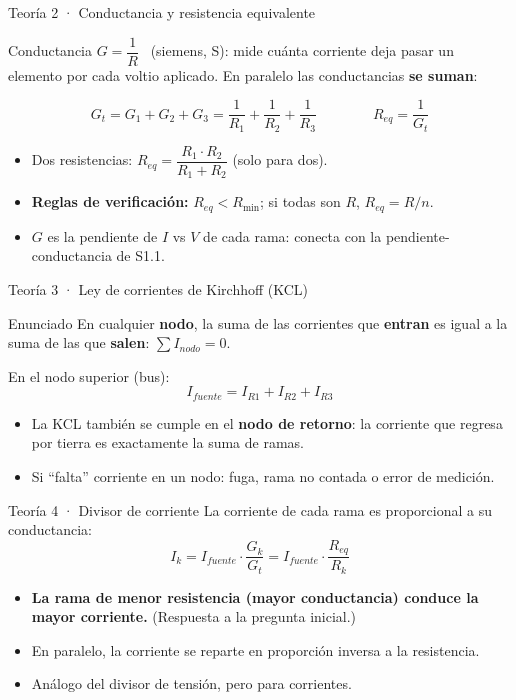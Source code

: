 \documentclass[aspectratio=169]{beamer}
\begin{document}
\begin{frame}{Teoría 2 · Conductancia y resistencia equivalente}
  \begin{block}{Conductancia}
    $G = \dfrac{1}{R}$ \ (siemens, S): mide cuánta corriente deja pasar un
    elemento por cada voltio aplicado. En paralelo las conductancias \textbf{se suman}:
  \end{block}
  \[
    G_t = G_1 + G_2 + G_3 = \frac{1}{R_1} + \frac{1}{R_2} + \frac{1}{R_3}
    \qquad\qquad
    R_{eq} = \frac{1}{G_t}
  \]
  \pause
  \begin{itemize}
    \item Dos resistencias: $R_{eq} = \dfrac{R_1\cdot R_2}{R_1 + R_2}$ (solo para dos).
    \item \textbf{Reglas de verificación:} $R_{eq} < R_{\min}$; si todas son $R$, $R_{eq} = R/n$.
    \item $G$ es la pendiente de $I$ vs $V$ de cada rama: conecta con la pendiente-conductancia de S1.1.
  \end{itemize}
\end{frame}

\begin{frame}{Teoría 3 · Ley de corrientes de Kirchhoff (KCL)}
  \begin{block}{Enunciado}
    En cualquier \textbf{nodo}, la suma de las corrientes que \textbf{entran} es
    igual a la suma de las que \textbf{salen}: $\displaystyle\sum I_{nodo} = 0$.
  \end{block}
  \pause
  En el nodo superior (bus):
  \[
    I_{fuente} = I_{R1} + I_{R2} + I_{R3}
  \]
  \pause
  \begin{itemize}
    \item La KCL también se cumple en el \textbf{nodo de retorno}: la corriente
      que regresa por tierra es exactamente la suma de ramas.
    \item Si ``falta'' corriente en un nodo: fuga, rama no contada o error de medición.
  \end{itemize}
\end{frame}

\begin{frame}{Teoría 4 · Divisor de corriente}
  La corriente de cada rama es proporcional a su conductancia:
  \[
    I_k = I_{fuente}\cdot\frac{G_k}{G_t} = I_{fuente}\cdot\frac{R_{eq}}{R_k}
  \]
  \pause
  \begin{itemize}
    \item \textbf{La rama de menor resistencia (mayor conductancia) conduce la
      mayor corriente.} (Respuesta a la pregunta inicial.)
    \item En paralelo, la corriente se reparte en proporción inversa a la resistencia.
    \item Análogo del divisor de tensión, pero para corrientes.
  \end{itemize}
\end{frame}
\end{document}
